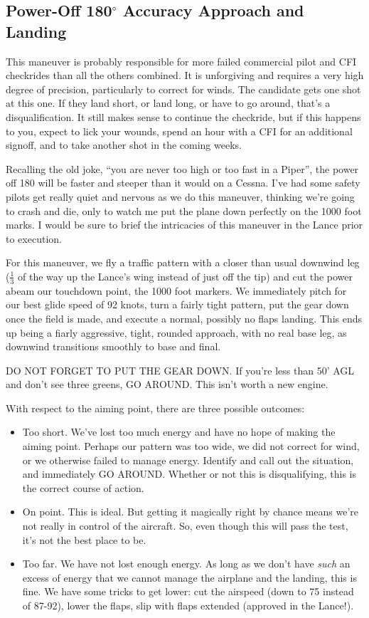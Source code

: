 \subsection{Power-Off 180$^\circ$ Accuracy Approach and Landing}

This maneuver is probably responsible for more failed commercial pilot and CFI checkrides than all the others combined. It is unforgiving and requires a very high degree of precision, particularly to correct for winds. The candidate gets one shot at this one. If they land short, or land long, or have to go around, that's a disqualification. It still makes sense to continue the checkride, but if this happens to you, expect to lick your wounds, spend an hour with a CFI for an additional signoff, and to take another shot in the coming weeks.

Recalling the old joke, ``you are never too high or too fast in a Piper'', the power off 180 will be faster and steeper than it would on a Cessna. I've had some safety pilots get really quiet and nervous as we do this maneuver, thinking we're going to crash and die, only to watch me put the plane down perfectly on the 1000 foot marks. I would be sure to brief the intricacies of this maneuver in the Lance prior to execution.

For this maneuver, we fly a traffic pattern with a closer than usual downwind leg ($\frac1 3$ of the way up the Lance's wing instead of just off the tip) and cut the power abeam our touchdown point, the 1000 foot markers. We immediately pitch for our best glide speed of 92 knots, turn a fairly tight pattern, put the gear down once the field is made, and execute a normal, possibly no flaps landing. This ends up being a fiarly aggressive, tight, rounded approach, with no real base leg, as downwind transitions smoothly to base and final.

DO NOT FORGET TO PUT THE GEAR DOWN. If you're less than 50' AGL and don't see three greens, GO AROUND. This isn't worth a new engine.

With respect to the aiming point, there are three possible outcomes:

\begin{itemize}
\item{Too short.} We've lost too much energy and have no hope of making the aiming point. Perhaps our pattern was too wide, we did not correct for wind, or we otherwise failed to manage energy. Identify and call out the situation, and immediately GO AROUND. Whether or not this is disqualifying, this is the correct course of action.
\item{On point.} This is ideal. But getting it magically right by chance means we're not really in control of the aircraft. So, even though this will pass the test, it's not the best place to be.
\item{Too far.} We have not lost enough energy. As long as we don't have \emph{such} an excess of energy that we cannot manage the airplane and the landing, this is fine. We have some tricks to get lower: cut the airspeed (down to 75 instead of 87-92), lower the flaps, slip with flaps extended (approved in the Lance!).
\end{itemize}

